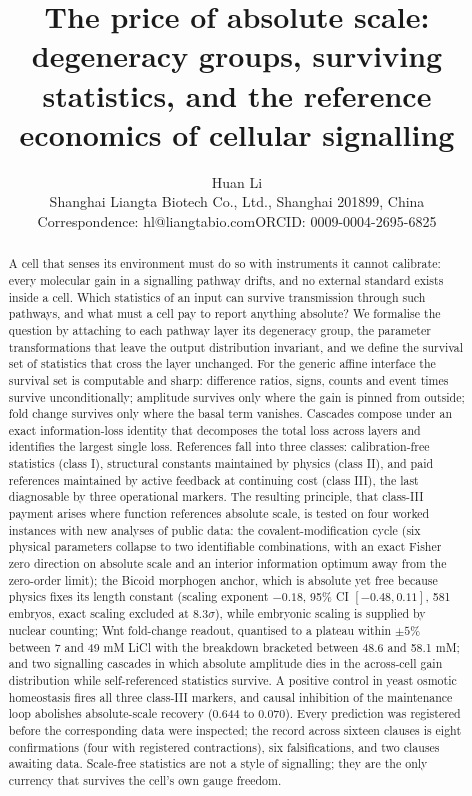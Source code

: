 \documentclass[11pt,a4paper]{article}
\title{\textbf{The price of absolute scale: degeneracy groups, surviving\\ statistics, and the reference economics of cellular signalling}}
\author{Huan Li\\[2pt]
\small Shanghai Liangta Biotech Co., Ltd., Shanghai 201899, China\\
\small Correspondence: hl@liangtabio.com\quad ORCID: 0009-0004-2695-6825}
\date{}
\begin{document}
\maketitle

\begin{abstract}
\noindent
A cell that senses its environment must do so with instruments it cannot calibrate: every molecular gain in a signalling pathway drifts, and no external standard exists inside a cell. Which statistics of an input can survive transmission through such pathways, and what must a cell pay to report anything absolute? We formalise the question by attaching to each pathway layer its degeneracy group, the parameter transformations that leave the output distribution invariant, and we define the survival set of statistics that cross the layer unchanged. For the generic affine interface the survival set is computable and sharp: difference ratios, signs, counts and event times survive unconditionally; amplitude survives only where the gain is pinned from outside; fold change survives only where the basal term vanishes. Cascades compose under an exact information-loss identity that decomposes the total loss across layers and identifies the largest single loss. References fall into three classes: calibration-free statistics (class I), structural constants maintained by physics (class II), and paid references maintained by active feedback at continuing cost (class III), the last diagnosable by three operational markers. The resulting principle, that class-III payment arises where function references absolute scale, is tested on four worked instances with new analyses of public data: the covalent-modification cycle (six physical parameters collapse to two identifiable combinations, with an exact Fisher zero direction on absolute scale and an interior information optimum away from the zero-order limit); the Bicoid morphogen anchor, which is absolute yet free because physics fixes its length constant (scaling exponent $-0.18$, 95\% CI $[-0.48, 0.11]$, 581 embryos, exact scaling excluded at $8.3\sigma$), while embryonic scaling is supplied by nuclear counting; Wnt fold-change readout, quantised to a plateau within $\pm5\%$ between 7 and 49 mM LiCl with the breakdown bracketed between 48.6 and 58.1 mM; and two signalling cascades in which absolute amplitude dies in the across-cell gain distribution while self-referenced statistics survive. A positive control in yeast osmotic homeostasis fires all three class-III markers, and causal inhibition of the maintenance loop abolishes absolute-scale recovery (0.644 to 0.070). Every prediction was registered before the corresponding data were inspected; the record across sixteen clauses is eight confirmations (four with registered contractions), six falsifications, and two clauses awaiting data. Scale-free statistics are not a style of signalling; they are the only currency that survives the cell's own gauge freedom.
\end{abstract}
\end{document}
